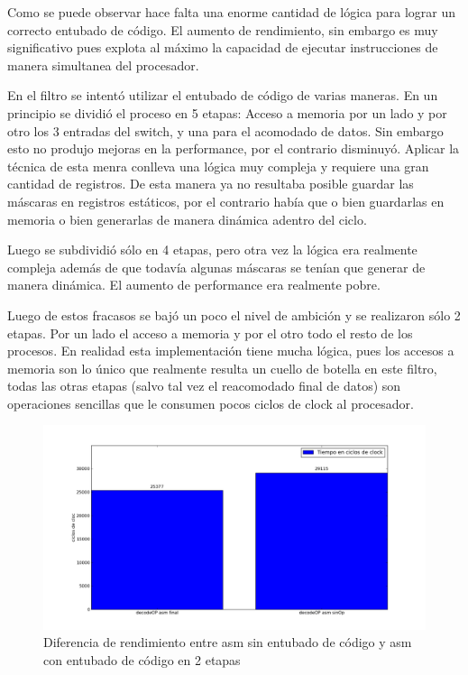 	Como se puede observar hace falta una enorme cantidad de lógica para
lograr un correcto entubado de código. El aumento de rendimiento, sin embargo
es muy significativo pues explota al máximo la capacidad de ejecutar instrucciones
de manera simultanea del procesador.
	

	En el filtro se intentó utilizar el entubado de código de varias maneras.
En un principio se dividió el proceso en 5 etapas: Acceso a memoria por un lado
y por otro los 3 entradas del switch, y una para el acomodado de datos. 
Sin embargo esto no produjo mejoras en la performance, por el contrario disminuyó.
Aplicar la técnica de esta menra conlleva una lógica muy compleja y requiere una gran cantidad
de registros. De esta manera ya no resultaba posible guardar las máscaras en registros estáticos,
por el contrario había que o bien guardarlas en memoria o bien generarlas de manera dinámica
adentro del ciclo.

	Luego se subdividió sólo en 4 etapas, pero otra vez la lógica era realmente compleja
además de que todavía algunas máscaras se tenían que generar de manera dinámica. El aumento de performance
era realmente pobre.

	Luego de estos fracasos se bajó un poco el nivel de ambición y se realizaron sólo 2 etapas. Por un lado 
el acceso a memoria y por el otro todo el resto de los procesos. En realidad esta implementación
tiene mucha lógica, pues los accesos a memoria son lo único que realmente resulta un cuello de botella
en este filtro, todas las otras etapas (salvo tal vez el reacomodado final de datos) son operaciones
sencillas que le consumen pocos ciclos de clock al procesador.



\begin{figure}[h]
\begin{center}
  \includegraphics[scale=0.4]{secciones/decodificacion/imagenes/decodeOP.png}
\end{center}
\caption{Diferencia de rendimiento entre asm sin entubado de código y asm con entubado de código en 2 etapas}
\label{fig:entubado de codigo}
\end{figure}



